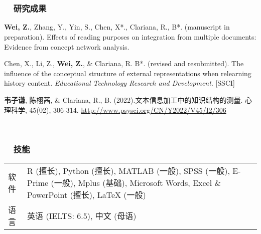\documentclass[a4paper, 12pt]{ctexart}
\begin{document}
\  \par
\  \par


\subsubsection*{ \ \ 研究成果}

\begin{description}
    
    \item \textbf{Wei, Z.}, Zhang, Y., Yin, S., Chen, X*., Clariana, R., B*. (manuscript in preparation). Effects of reading purposes on integration from multiple documents: Evidence from concept network analysis.

    \item Chen, X., Li, Z., \textbf{Wei, Z.}, \& Clariana, R. B*. (revised and resubmitted). The influence of the conceptual structure of external representations when relearning history content. \textit{Educational Technology Research and Development}. [SSCI]

    \item \textbf{韦子谦}, 陈栩茜, \& Clariana, R., B. (2022).文本信息加工中的知识结构的测量. 心理科学, 45(02), 306-314. \href{http://www.psysci.org/CN/Y2022/V45/I2/306}{http://www.psysci.org/CN/Y2022/V45/I2/306}

    
    \end{description}

\  \par


\subsubsection*{ \ \ 技能}

\begin{tabularx}{\textwidth}{p{2cm} X}
    
    软件 & R (擅长), Python (擅长), MATLAB (一般), SPSS (一般), E-Prime (一般), Mplus (基础), Microsoft Words, Excel \& PowerPoint (擅长), LaTeX (一般) \\
    
    语言 &英语 (IELTS: 6.5), 中文 (母语) \\
    
    \end{tabularx}
\end{document}
